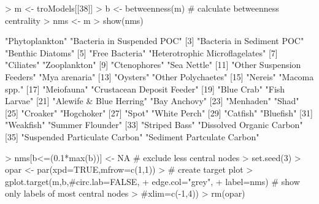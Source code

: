 \documentclass[article]{jss}
\begin{document}
\begin{Schunk}
\begin{Sinput}
> m <- troModels[[38]]
> b <- betweenness(m)         # calculate betweenness centrality
> nms <- m%
> show(nms)
\end{Sinput}
\begin{Soutput}
 [1] "Phytoplankton"                 "Bacteria in Suspended POC"    
 [3] "Bacteria in Sediment POC"      "Benthic Diatoms"              
 [5] "Free Bacteria"                 "Heterotrophic Microflagelates"
 [7] "Ciliates"                      "Zooplankton"                  
 [9] "Ctenophores"                   "Sea Nettle"                   
[11] "Other Suspension Feeders"      "Mya arenaria"                 
[13] "Oysters"                       "Other Polychaetes"            
[15] "Nereis"                        "Macoma spp."                  
[17] "Meiofauna"                     "Crustacean Deposit Feeder"    
[19] "Blue Crab"                     "Fish Larvae"                  
[21] "Alewife & Blue Herring"        "Bay Anchovy"                  
[23] "Menhaden"                      "Shad"                         
[25] "Croaker"                       "Hogchoker"                    
[27] "Spot"                          "White Perch"                  
[29] "Catfish"                       "Bluefish"                     
[31] "Weakfish"                      "Summer Flounder"              
[33] "Striped Bass"                  "Dissolved Organic Carbon"     
[35] "Suspended Particulate Carbon"  "Sediment Partculate Carbon"   
\end{Soutput}
\begin{Sinput}
> nms[b<=(0.1*max(b))] <- NA  # exclude less central nodes
> set.seed(3)
> opar <- par(xpd=TRUE,mfrow=c(1,1))
> # create target plot
> gplot.target(m,b,#circ.lab=FALSE,
+               edge.col="grey",
+               label=nms) # show only labels of most central nodes
>              #xlim=c(-1,4))
> rm(opar)
\end{Sinput}
\end{Schunk}
\end{document}
